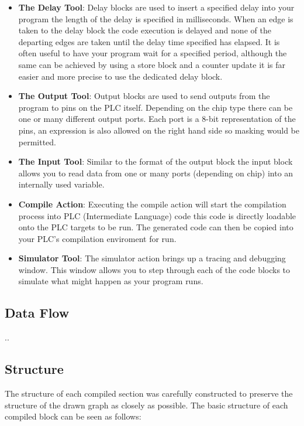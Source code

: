 \begin{itemize}
\item \textbf{The Delay Tool}: Delay blocks are used to insert a specified delay into your program the length of the delay is specified in milliseconds. When an edge is taken to the delay block the code execution is delayed and none of the departing edges are taken until the delay time specified has elapsed. It is often useful to have your program wait for a specified period, although the same can be achieved by using a store block and a counter update it is far easier and more precise to use the dedicated delay block.
\item \textbf{The Output Tool}: Output blocks are used to send outputs from the program to pins on the PLC itself. Depending on the chip type there can be one or many different output ports. Each port is a 8-bit representation of the pins, an expression is also allowed on the right hand side so masking would be permitted.
\item \textbf{The Input Tool}: Similar to the format of the output block the input block allows you to read data from one or many ports (depending on chip) into an internally used variable.

\item \textbf{Compile Action}: Executing the compile action will start the compilation process into PLC  (Intermediate Language) code this code is directly loadable onto the PLC targets to be run. The generated code can then be copied into your PLC's compilation enviroment for run.

\item \textbf{Simulator Tool}: The simulator action brings up a tracing and debugging window. This window allows you to step through each of the code blocks to simulate what might happen as your program runs.
\end{itemize}




\subsection{Data Flow}
..
\subsection{Structure}
The structure of each compiled section was carefully constructed to preserve the structure of the drawn graph as closely as possible. The basic structure of each compiled block can be seen as follows:

